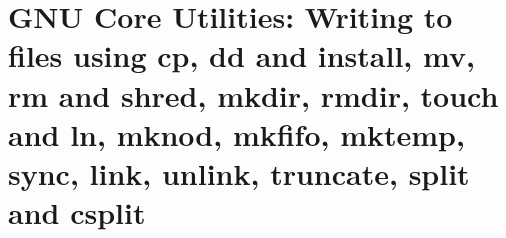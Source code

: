 
\chapter{GNU Core Utilities: Writing to files using cp, dd and install, mv, rm and shred, mkdir, rmdir, touch and ln, mknod, mkfifo, mktemp, sync, link, unlink, truncate, split and csplit}

